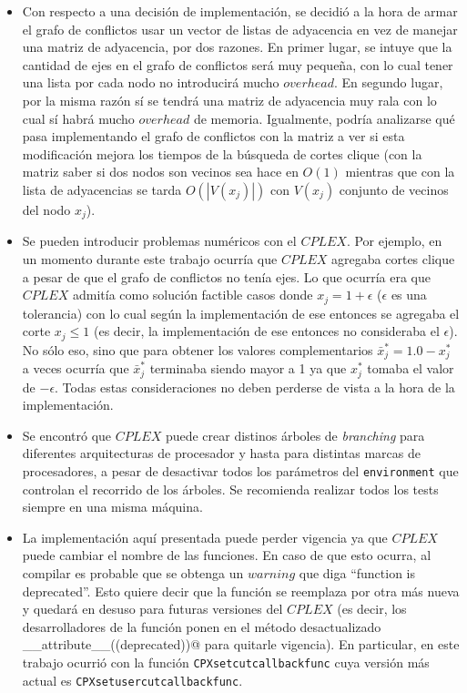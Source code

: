 \begin{itemize}
\item Con respecto a una decisión de implementación, se decidió a la hora de armar el grafo de conflictos usar un vector de listas de adyacencia en vez de manejar una matriz de adyacencia, por dos razones. En primer lugar, se intuye que la cantidad de ejes en el grafo de conflictos será muy pequeña, con lo cual tener una lista por cada nodo no introducirá mucho $overhead$. En segundo lugar, por la misma razón sí se tendrá una matriz de adyacencia muy rala con lo cual sí habrá mucho $overhead$ de memoria. Igualmente, podría analizarse qué pasa implementando el grafo de conflictos con la matriz a ver si esta modificación mejora los tiempos de la búsqueda de cortes clique (con la matriz saber si dos nodos son vecinos sea hace en $O(1)$ mientras que con la lista de adyacencias se tarda $O(|V(x_j)|)$ con $V(x_j)$ conjunto de vecinos del nodo $x_j$).


\item Se pueden introducir problemas numéricos con el $CPLEX$. Por ejemplo, en un momento durante este trabajo ocurría que $CPLEX$ agregaba cortes clique a pesar de que el grafo de conflictos no tenía ejes. Lo que ocurría era que $CPLEX$ admitía como solución factible casos donde $x_j = 1 + \epsilon$ ($\epsilon$ es una tolerancia) con lo cual según la implementación de ese entonces se agregaba el corte $x_j \leq 1$ (es decir, la implementación de ese entonces no consideraba el $\epsilon$). No sólo eso, sino que para obtener los valores complementarios $\bar{x}^*_j = 1.0 - x^*_j$ a veces ocurría que $\bar{x}^*_j$ terminaba siendo mayor a 1 ya que $x^*_j$ tomaba el valor de $-\epsilon$. Todas estas consideraciones no deben perderse de vista a la hora de la implementación.


\item Se encontró que $CPLEX$ puede crear distinos árboles de \emph{branching} para diferentes arquitecturas de procesador y hasta para distintas marcas de procesadores, a pesar de desactivar todos los parámetros del \verb_environment_ que controlan el recorrido de los árboles. Se recomienda realizar todos los tests siempre en una misma máquina.


\item La implementación aquí presentada puede perder vigencia ya que $CPLEX$ puede cambiar el nombre de las funciones. En caso de que esto ocurra, al compilar es probable que se obtenga un $warning$ que diga ``function is deprecated''. Esto quiere decir que la función se reemplaza por otra más nueva y quedará en desuso para futuras versiones del $CPLEX$ (es decir, los desarrolladores de la función ponen en el método desactualizado \verb@__attribute__((deprecated))@ para quitarle vigencia). En particular, en este trabajo ocurrió con la función \verb_CPXsetcutcallbackfunc_ cuya versión más actual es \verb_CPXsetusercutcallbackfunc_.

\end{itemize}
